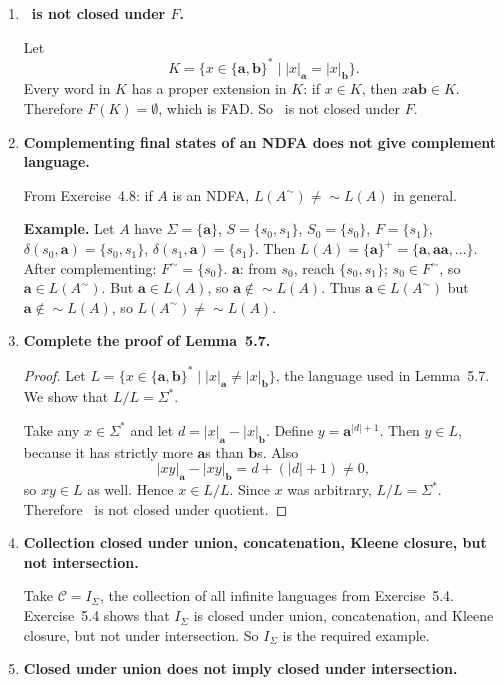 \begin{enumerate}[{5.}1. ]
\item \textbf{\NSIG\ is not closed under $F$.}

Let
\[
K=\{x\in\{\pmb{a},\pmb{b}\}^*\mid |x|_{\pmb{a}}=|x|_{\pmb{b}}\}.
\]
Every word in $K$ has a proper extension in $K$:
if $x\in K$, then $x\pmb{ab}\in K$.  Therefore $F(K)=\emptyset$, which is FAD.
So \NSIG\ is not closed under $F$.

\item \textbf{Complementing final states of an NDFA does not give complement language.}

From Exercise~4.8: if $A$ is an NDFA, $L(A^\sim)\neq\sim L(A)$ in general.

\textbf{Example.}  Let $A$ have $\Sigma=\{\pmb{a}\}$, $S=\{s_0,s_1\}$, $S_0=\{s_0\}$, $F=\{s_1\}$,
$\delta(s_0,\pmb{a})=\{s_0,s_1\}$, $\delta(s_1,\pmb{a})=\{s_1\}$.
Then $L(A)=\{\pmb{a}\}^+=\{\pmb{a},\pmb{aa},\ldots\}$.
After complementing: $F^\sim=\{s_0\}$.
$\pmb{a}$: from $s_0$, reach $\{s_0,s_1\}$; $s_0\in F^\sim$, so $\pmb{a}\in L(A^\sim)$.
But $\pmb{a}\in L(A)$, so $\pmb{a}\notin\sim L(A)$.  Thus $\pmb{a}\in L(A^\sim)$ but $\pmb{a}\notin\sim L(A)$, so $L(A^\sim)\neq\sim L(A)$.

\item \textbf{Complete the proof of Lemma~5.7.}

\begin{proof}
Let
$L=\{x\in\{\pmb{a},\pmb{b}\}^*\mid |x|_{\pmb{a}}\neq |x|_{\pmb{b}}\}$, the
language used in Lemma~5.7.  We show that $L/L=\Sigma^*$.

Take any $x\in\Sigma^*$ and let $d=|x|_{\pmb{a}}-|x|_{\pmb{b}}$.  Define
$y=\pmb{a}^{|d|+1}$.  Then $y\in L$, because it has strictly more $\pmb{a}$s
than $\pmb{b}$s.  Also
\[
|xy|_{\pmb{a}}-|xy|_{\pmb{b}}
= d+(|d|+1)\neq 0,
\]
so $xy\in L$ as well.  Hence $x\in L/L$.  Since $x$ was arbitrary,
$L/L=\Sigma^*$.  Therefore \NSIG\ is not closed under quotient.
\end{proof}

\item \textbf{Collection closed under union, concatenation, Kleene closure, but not intersection.}

Take $\mathcal{C}=I_\Sigma$, the collection of all infinite languages from
Exercise~5.4.  Exercise~5.4 shows that $I_\Sigma$ is closed under union,
concatenation, and Kleene closure, but not under intersection.  So
$I_\Sigma$ is the required example.

\item \textbf{Closed under union does not imply closed under intersection.}


\end{enumerate}
